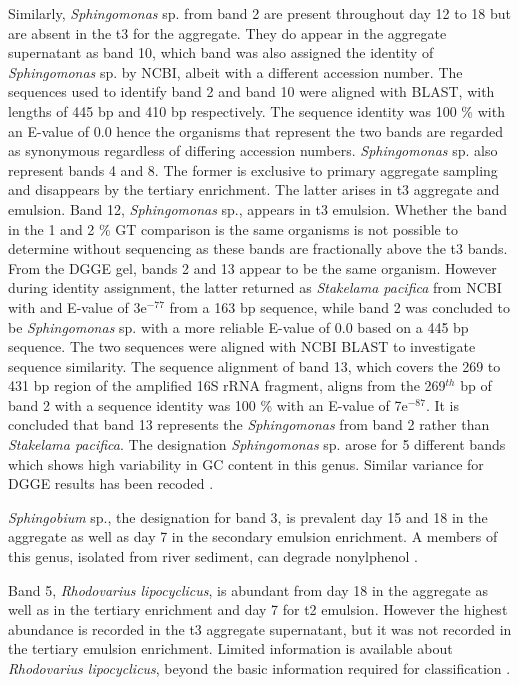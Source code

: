 \documentclass[11pt]{article}
\begin{document}
Similarly, \emph{Sphingomonas} sp. from band 2 are present throughout day 12 to 18 but are absent in the t3 for the aggregate. They do appear in the aggregate supernatant as band 10, which band was also assigned the identity of \emph{Sphingomonas} sp. by NCBI, albeit with a different accession number. The sequences used to identify band 2 and band 10 were aligned with BLAST, with lengths of 445 bp and 410 bp respectively. The sequence identity was 100 \% with an E-value of 0.0 hence the organisms that represent the two bands are regarded as synonymous regardless of differing accession numbers.
\emph{Sphingomonas} sp. also represent bands 4 and 8. The former is exclusive to primary aggregate sampling and disappears by the tertiary enrichment. The latter arises in t3 aggregate and emulsion.
Band 12, \emph{Sphingomonas} sp., appears in t3 emulsion. Whether the band in the 1 and 2 \% GT comparison is the same organisms is not possible to determine without sequencing as these bands are fractionally above the t3 bands.
From the DGGE gel, bands 2 and 13 appear to be the same organism. However during identity assignment, the latter returned as \emph{Stakelama pacifica} from NCBI with and E-value of 3e$^{-77}$ from a 163 bp sequence, while band 2 was concluded to be \emph{Sphingomonas} sp. with a more reliable E-value of 0.0 based on a 445 bp sequence. The two sequences were aligned with NCBI BLAST to investigate sequence similarity. The sequence alignment of band 13, which covers the 269 to 431 bp region of the amplified 16S rRNA fragment, aligns from the 269$^{th}$ bp of band 2 with a sequence identity was 100 \% with an E-value of 7e$^{-87}$. It is concluded that band 13 represents the \emph{Sphingomonas} from band 2 rather than \emph{Stakelama pacifica}.
The designation \emph{Sphingomonas} sp. arose for 5 different bands which shows high variability in GC content in this genus. Similar variance for DGGE results has been recoded \cite{qiao2012effect}.

\emph{Sphingobium} sp., the designation for band 3, is prevalent day 15 and 18 in the aggregate as well as day 7 in the secondary emulsion enrichment. A members of this genus, isolated from river sediment, can degrade nonylphenol \cite{ushiba2003sphingobium}.


Band 5, \emph{Rhodovarius lipocyclicus}, is abundant from day 18 in the aggregate as well as in the tertiary enrichment and day 7 for t2 emulsion. However the highest abundance is recorded in the t3 aggregate supernatant, but it was not recorded in the tertiary emulsion enrichment. Limited information is available about \emph{Rhodovarius lipocyclicus}, beyond the basic information required for classification \cite{kampfer2004rhodovarius}.
\end{document}
